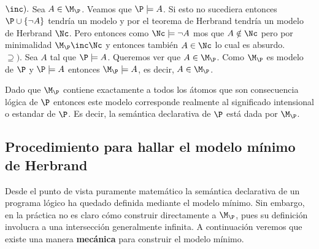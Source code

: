 \documentclass[11pt,letterpaper]{article}
\begin{document}
\proof\\
$\inc).$ Sea $A\in\M_\P$. Veamos que $\P\models A$. Si esto no sucediera 
entonces $\P\cup\{\neg A\}$ tendr\'ia un modelo y por el teorema de Herbrand 
tendr\'ia un modelo de Herbrand $\Nc$. Pero entonces como $\Nc\models\neg A$ 
mos que $A\notin\Nc$ pero por minimalidad  $\M_\P\inc\Nc$ y entonces 
tambi\'en $A\in\Nc$ lo cual es absurdo.\\
$\supseteq).$ Sea $A$ tal que $\P\models A$. Queremos ver que $A\in\M_\P$. Como 
$\M_\P$ es modelo de $\P$ y $\P\models A$ entonces $\M_\P\models A$, es decir, 
$A\in\M_\P$.

\medskip

Dado que $\M_\P$ contiene exactamente a todos los \'atomos que son 
consecuencia
l\'ogica de $\P$ entonces este modelo corresponde realmente al significado
intensional o estandar de $\P$. Es decir, la sem\'antica declarativa de $\P$ 
est\'a dada por $\M_\P$.


\subsection{Procedimiento para hallar el modelo m\'inimo de Herbrand}

Desde el punto de vista puramente matem\'atico la sem\'antica declarativa de un
programa l\'ogico ha quedado definida mediante el modelo m\'inimo. Sin embargo, 
en la pr\'actica no es claro c\'omo construir directamente a $\M_\P$, pues su
definici\'on involucra a una intersecci\'on generalmente infinita. A 
continuaci\'on veremos que existe una manera \textbf{mec\'anica} para construir 
el modelo m\'inimo.

\end{document}
